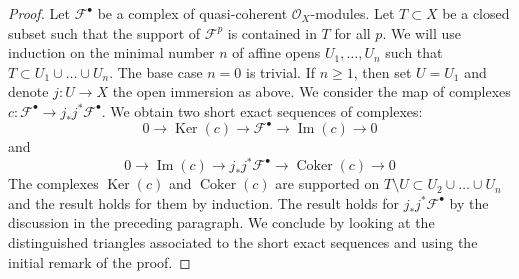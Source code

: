 \documentclass{amsart}
\theoremstyle{plain}
\theoremstyle{definition}
\theoremstyle{remark}
\numberwithin{equation}{subsection}
\def\Ker{\mathop{\mathrm{Ker}}}
\def\Im{\mathop{\mathrm{Im}}}
\def\Coker{\mathop{\mathrm{Coker}}}
\begin{document}
\begin{proof}
\medskip\noindent
Let $\mathcal{F}^\bullet$ be a complex of quasi-coherent
$\mathcal{O}_X$-modules. Let $T \subset X$ be a closed subset
such that the support of $\mathcal{F}^p$ is contained in $T$
for all $p$. We will use induction on the minimal number $n$
of affine opens $U_1, \ldots, U_n$ such that
$T \subset U_1 \cup \ldots \cup U_n$. The base case $n = 0$ is trivial.
If $n \geq 1$, then set $U = U_1$ and denote $j : U \to X$ the
open immersion as above. We consider the map of complexes
$c : \mathcal{F}^\bullet \to j_*j^*\mathcal{F}^\bullet$.
We obtain two short exact sequences of complexes:
$$
0 \to \Ker(c) \to \mathcal{F}^\bullet \to \Im(c) \to 0
$$
and
$$
0 \to \Im(c) \to j_*j^*\mathcal{F}^\bullet \to \Coker(c) \to 0
$$
The complexes $\Ker(c)$ and $\Coker(c)$ are supported
on $T \setminus U \subset U_2 \cup \ldots \cup U_n$ and the result
holds for them by induction. The result holds for
$j_*j^*\mathcal{F}^\bullet$ by the discussion in the preceding
paragraph. We conclude by looking at the distinguished triangles
associated to the short exact sequences and using the initial
remark of the proof.
\end{proof}
\end{document}
